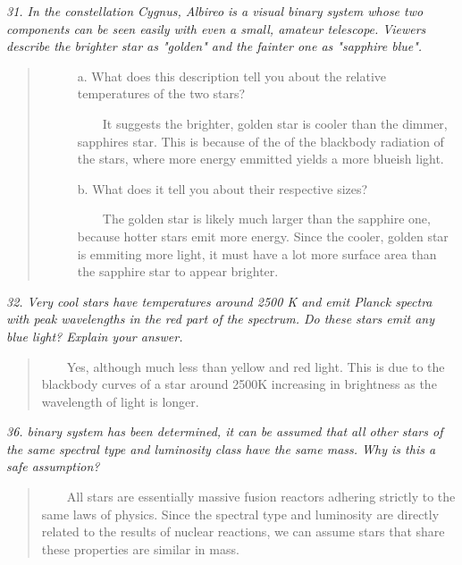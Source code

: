 \documentclass[letterpaper,10pt]{article}
\begin{document}
\par
\it
31. In the constellation Cygnus, Albireo is a visual binary system
whose two components can be seen easily with even a small,
amateur telescope. Viewers describe the brighter star as "golden"
and the fainter one as "sapphire blue".
\begin{quote}
\begin{description}
    \item[]
    a. What does this description tell you about the relative
    temperatures of the two stars?
\normalfont
\par
	~~~~It suggests the brighter, golden star is cooler than
    the dimmer, sapphires star. This is because of the of the
    blackbody radiation of the stars, where more energy emmitted
    yields a more blueish light.
\par
\it
    \item[]
    b. What does it tell you about their respective sizes?
\normalfont
    \par
	~~~~The golden star is likely much larger than the sapphire one,
    because hotter stars emit more energy. Since the cooler, golden
    star is emmiting more light, it must have a lot more surface area
    than the sapphire star to appear brighter.
\end{description}
\end{quote}

\par
\it
32. Very cool stars have temperatures around 2500 K and emit
Planck spectra with peak wavelengths in the red part of the
spectrum. Do these stars emit any blue light? Explain your answer.
\normalfont
\begin{quote}
	~~~~Yes, although much less than yellow and red light. This is
    due to the blackbody curves of a star around 2500K increasing
    in brightness as the wavelength of light is longer.
\end{quote}


\par
\it
36. binary system has been determined, it can be assumed that
all other stars of the same spectral type and luminosity class
have the same mass. Why is this a safe assumption?
\normalfont
    \begin{quote}
	~~~~All stars are essentially massive fusion reactors adhering
    strictly to the same laws of physics. Since the spectral type and
    luminosity are directly related to the results of nuclear
    reactions, we can assume stars that share these properties
    are similar in mass.
\end{quote}
\end{document}

